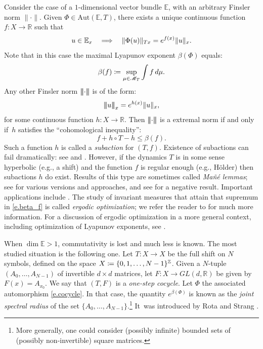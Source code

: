 \documentclass[10pt]{amsart}
\let\mathcal\mathscr
\def\vcentcolon{\mathrel{\mathop\ordinarycolon}}
\providecommand\ordinarycolon{:}
\providecommand*\coloneqq{\vcentcolon\mathrel{\mkern-1.2mu}=}
\newcommand\implique{\mathchoice{\Longrightarrow}{\Rightarrow}{\Rightarrow}{\Rightarrow}}
\theoremstyle{plain}
\theoremstyle{definition}
\newcommand{\tribar}[1]{\mathopen{| {\kern -1.5pt} | {\kern -1.5pt} |} {#1}
\mathclose{| {\kern -1.5pt} | {\kern -1.5pt} |}}
\newcommand{\RR}{\mathbb{R}}
\newcommand{\ZZ}{\mathbb{Z}}
\newcommand{\EE}{\mathbb{E}}
\newcommand{\cM}{\mathcal{M}}
\newcommand{\GL}{\mathit{GL}}
\newcommand{\Aut}{\mathrm{Aut}}
\begin{document}
Consider the case of a $1$-dimensional vector bundle $\EE$, with an arbitrary Finsler norm $\| \mathord{\cdot} \|$.
Given $\Phi \in \Aut(\EE,T)$, there exists a unique continuous function $f \colon X \to \RR$ such that
\begin{equation}\label{e.operator}
u \in \EE_x \quad \implique \quad \|\Phi(u)\|_{Tx} = e^{f(x)} \| u\|_x.
\end{equation}
Note that in this case the maximal Lyapunov exponent $\beta(\Phi)$ equals:
\begin{equation}\label{e.beta_f}
\beta (f) \coloneqq \sup_{\mu \in \cM_T} \int f \, d\mu.
\end{equation}
Any other Finsler norm $\tribar{\cdot}$ is of the form:
\[
\tribar{u}_x = e^{h(x)} \| u\|_x,
\]
for some continuous function $h \colon X \to \RR$.
Then $\tribar{\cdot}$ is a extremal norm if and only if~$h$ satisfies the ``cohomological inequality'':
\[
f + h \circ T - h \le \beta(f).
\]
Such a function $h$ is called a \emph{subaction} for $(T,f)$.
Existence of subactions can fail dramatically: see \eg \cite[\S3]{Bousch_Jenkinson} and \cite[App.]{Garibaldi_book}.
However, if the dynamics $T$ is in some sense hyperbolic (e.g., a shift) and the function $f$ is regular enough (e.g., Hölder) then subactions $h$ do exist. Results of this type are sometimes called \emph{Mañé lemmas}; see \hbox{\cite{CG,Sav,CLT,Bousch_Walters,Bousch_amphi}} for various versions and approaches, and see \cite[Prop.\,2.1]{Bochi_ICM} for a negative result.
Important applications include \cite{Bousch_Mairesse,Contreras}. The study of invariant measures that attain that supremum in \eqref{e.beta_f} is called \emph{ergodic optimization}; we refer the reader to \cite{Jenkinson_survey,Jenkinson_survey_new,Garibaldi_book} for much more information. For a discussion of ergodic optimization in a more general context, including optimization of Lyapunov exponents, see \cite{Bochi_ICM}.

When $\dim \EE > 1$, commutativity is lost and much less is known.
The most studied situation is the following one.
Let $T \colon X \to X$ be the full shift on $N$ symbols, defined on the space $X \coloneqq \{0,1,\dots,N-1\}^\ZZ$.
Given a $N$-tuple $(A_0,\dots,A_{N-1})$ of invertible $d \times d$ matrices, let
$F \colon X \to \GL(d,\RR)$ be given by $F(x) = A_{x_0}$.
We say that $(T,F)$ is a \emph{one-step cocycle}.
Let $\Phi$ the associated automorphism \eqref{e.cocycle}.
In that case, the quantity $e^{\beta(\Phi)}$ is known as the \emph{joint spectral radius} of the set $\{A_0,\dots,A_{N-1}\}$.\footnote{More generally, one could consider (possibly infinite) bounded sets of (possibly non-invertible) square matrices.}
It~was introduced by Rota and Strang \cite{RS}.
\end{document}
